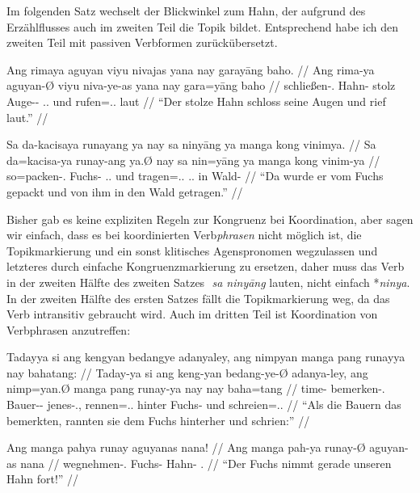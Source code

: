 \documentclass[12pt,paper=a4]{scrartcl}
\newcommand{\PargI}{{\Parg}.{\Inan}}
\newcommand{\TsgM}{{\Tsg}.{\M}}
\newcommand{\TplM}{{\Tpl}.{\M}}
\newcommand{\zwsp}{\mbox{​}} %
\newcommand{\rayr}[2]{\zwsp\smash{{\Tagati #1}} \emph{#2}} %
\begin{document}
Im folgenden Satz wechselt der Blickwinkel zum Hahn, der aufgrund des Erzählflusses auch im zweiten Teil die Topik bildet. Entsprechend habe ich den zweiten Teil mit passiven Verbformen zurückübersetzt. 

\pex %
\a\begingl
	\gla Ang rimaya aguyan viyu nivajas yana nay garayāng baho. //
	\glb Ang rima-ya aguyan-Ø viyu niva-ye-as yana nay gara=yāng baho //
	\glc \AgtT{} schließen-\TsgM{} Hahn-\Top{} stolz Auge-\Pl{}-\Parg{} \TsgM{}.\Gen{} und rufen=\TsgM{}.\Aarg{} laut //
	\glft \enquote{Der stolze Hahn schloss seine Augen und rief laut.} //
\endgl

\a\begingl
	\gla Sa da-kacisaya runayang ya nay sa ninyāng ya manga kong vinimya. //
	\glb Sa da=kacisa-ya runay-ang ya.Ø nay sa nin=yāng ya manga kong vinim-ya //
	\glc \PatT{} so=packen-\TsgM{} Fuchs-\Aarg{} \TsgM{}.\Top{} und \PatT{} tragen=\TsgM{}.\Aarg{} \TsgM{}.\Top{} \Dyn{} in Wald-\Loc{} //
	\glft \enquote{Da wurde er vom Fuchs gepackt und von ihm in den Wald getragen.} //
\endgl

\xe

Bisher gab es keine expliziten Regeln zur Kongruenz bei Koordination, aber sagen wir einfach, dass es bei koordinierten Verb\emph{phrasen} nicht möglich ist, die Topikmarkierung und ein sonst klitisches Agenspronomen wegzulassen und letzteres durch einfache Kongruenzmarkierung zu ersetzen, daher muss das Verb in der zweiten Hälfte des zweiten Satzes \rayr{s ninFyaaNF}{sa ninyāng} lauten, nicht einfach *\rayr{ninY}{ninya}. In der zweiten Hälfte des ersten Satzes fällt die Topikmarkierung weg, da das Verb intransitiv gebraucht wird. Auch im dritten Teil ist Koordination von Verbphrasen anzutreffen:

\pex %
\a\begingl
	\gla Tadayya si ang kengyan bedangye adanyaley, ang nimpyan manga pang runayya nay bahatang: //
	\glb Taday-ya si ang keng-yan bedang-ye-Ø adanya-ley, ang nimp=yan.Ø manga pang runay-ya nay nay baha=tang //
	\glc time-\Loc{} \Rel{} \AgtT{} bemerken-\TplM{} Bauer-\Pl{}-\Top{} jenes-\PargI{}, \AgtT{} rennen=\TplM{}.\Top{} \Dyn{} hinter Fuchs-\Loc{} und schreien=\TplM{}.\Aarg{} //
	\glft \enquote{Als die Bauern das bemerkten, rannten sie dem Fuchs hinterher und schrien:} //
\endgl

\a\begingl
	\gla Ang manga pahya runay aguyanas nana! //
	\glb Ang manga pah-ya runay-Ø aguyan-as nana //
	\glc \AgtT{} \Prog{} wegnehmen-\TsgM{} Fuchs-\Top{} Hahn-\Parg{} \Fsg{}.\Gen{} //
	\glft \enquote{Der Fuchs nimmt gerade unseren Hahn fort!} //
\endgl
\end{document}
